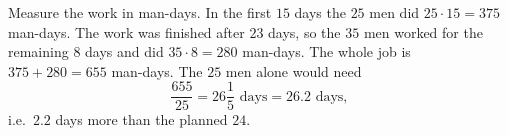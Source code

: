 Measure the work in man-days. In the first $15$ days the $25$ men did $25\cdot15=375$ man-days. The work was finished after $23$ days, so the $35$ men worked for the remaining $8$ days and did $35\cdot8=280$ man-days. The whole job is $375+280=655$ man-days. The $25$ men alone would need
\[
\dfrac{655}{25}=\boxed{26\dfrac{1}{5}\text{ days}}=26.2\text{ days},
\]
i.e.\ $2.2$ days more than the planned $24$.
